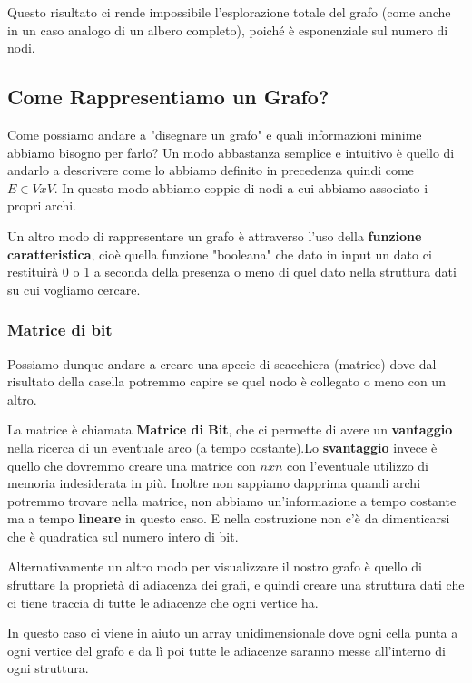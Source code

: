 Questo risultato ci rende impossibile l'esplorazione totale del grafo (come anche in un caso analogo di un albero completo), poiché è esponenziale sul numero di nodi.

\subsection{Come Rappresentiamo un Grafo?}
Come possiamo andare a "disegnare un grafo" e quali informazioni minime abbiamo bisogno per farlo?
Un modo abbastanza semplice e intuitivo è quello di andarlo a descrivere come lo abbiamo definito in precedenza quindi come $E \in V x V$. In questo modo abbiamo coppie di nodi a cui abbiamo associato i propri archi.

Un altro modo di rappresentare un grafo è attraverso l'uso della \textbf{funzione caratteristica}, cioè quella funzione "booleana" che dato in input un dato ci restituirà 0 o 1 a seconda della presenza o meno di quel dato nella struttura dati su cui vogliamo cercare.

\subsubsection{Matrice di bit}

Possiamo dunque andare a creare una specie di scacchiera (matrice) dove dal risultato della casella potremmo capire se quel nodo è collegato o meno con un altro.

La matrice è chiamata \textbf{Matrice di Bit}, che ci permette di avere un \textbf{vantaggio} nella ricerca di un eventuale arco (a tempo costante).Lo \textbf{svantaggio} invece è quello che dovremmo creare una matrice con $nxn$ con l'eventuale utilizzo di memoria indesiderata in più. Inoltre non sappiamo dapprima quandi archi potremmo trovare nella matrice, non abbiamo un'informazione a tempo costante ma a tempo \textbf{lineare} in questo caso. E nella costruzione non c'è da dimenticarsi che è quadratica sul numero intero di bit.

Alternativamente un altro modo per visualizzare il nostro grafo è quello di sfruttare la proprietà di adiacenza dei grafi, e quindi creare una struttura dati che ci tiene traccia di tutte le adiacenze che ogni vertice ha.

In questo caso ci viene in aiuto un array unidimensionale dove ogni cella punta a ogni vertice del grafo e da lì poi tutte le adiacenze saranno messe all'interno di ogni struttura.


